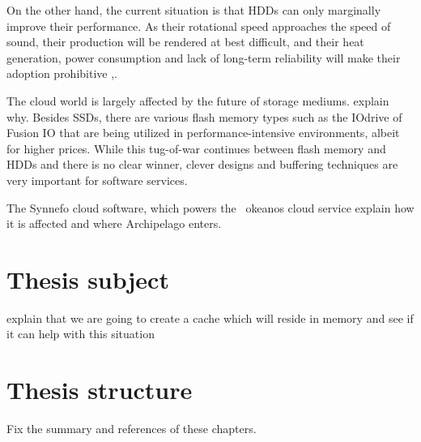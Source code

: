 On the other hand, the current situation is that HDDs can only marginally 
improve their performance. As their rotational speed approaches the speed of 
sound, their production will be rendered at best difficult, and their heat 
generation, power consumption and lack of long-term reliability will make their
adoption prohibitive \cite{hddtrends},\cite{speed-of-sound}.

The cloud world is largely affected by the future of storage mediums.  \fixme 
explain why. Besides SSDs, there are various flash memory types such as the 
IOdrive of Fusion IO that are being utilized in performance-intensive 
environments, albeit for higher prices. While this tug-of-war continues between 
flash memory and HDDs and there is no clear winner, clever designs and 
buffering techniques are very important for software services.

The Synnefo \cite{synnefo} cloud software, which powers the ~okeanos cloud 
service \cite{okeanos} \fixme explain how it is affected and where Archipelago 
enters.

\section{Thesis subject}

\todo explain that we are going to create a cache which will reside in memory 
and see if it can help with this situation

\section{Thesis structure}

\fixme Fix the summary and references of these chapters.


